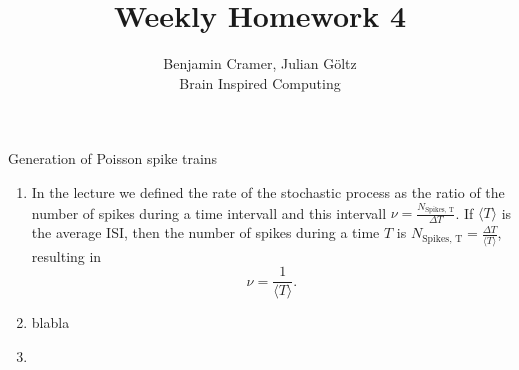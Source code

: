 \documentclass[12pt]{article}
\newenvironment{exercise}[2][Exercise]{\begin{trivlist}
\item[\hskip \labelsep {\bfseries #1}\hskip \labelsep {\bfseries #2.}]}{\end{trivlist}}
\begin{document}
 
 
\title{Weekly Homework 4}
\author{Benjamin Cramer, Julian G\"oltz\\
Brain Inspired Computing}
 
\maketitle
 
\begin{exercise}{4.1}
Generation of Poisson spike trains \\
\renewcommand{\labelenumi}{\alph{enumi})}
\begin{enumerate}
\item In the lecture we defined the rate of the stochastic process as the ratio of the number of spikes during a time intervall and this intervall $\nu = \frac{N_\textrm{Spikes, T}}{\Delta T}$. If $\langle T\rangle$ is the average ISI, then the number of spikes during a time $T$ is $N_\text{Spikes, T} = \frac{\Delta T}{\langle T \rangle}$, resulting in \[\nu = \frac{1}{\langle T \rangle}.\]
\item blabla
\item
\end{enumerate}

\end{exercise}
\end{document}
